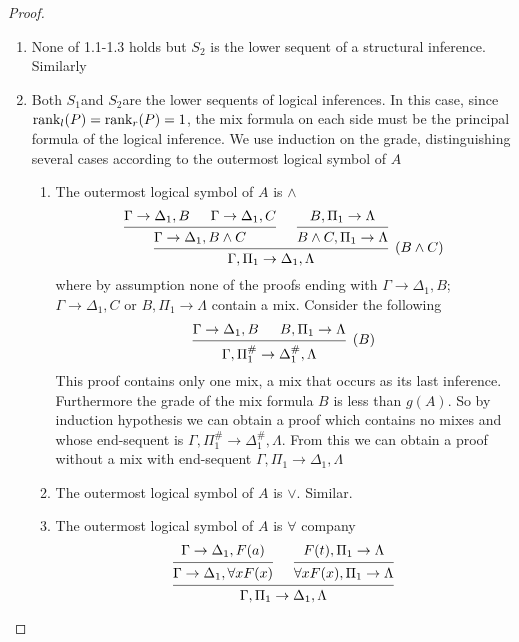 \documentclass[11pt]{article}
\begin{document}
\begin{proof}
\begin{enumerate}
\begin{enumerate}
\item None of 1.1-1.3 holds but \(S_2\) is the lower sequent of a structural
inference. Similarly
\item Both \(S_1\)and \(S_2\)are the lower sequents of logical inferences. In
this case, since \(\text{rank}_l(P)=\text{rank}_r(P)=1\), the mix formula on each
side must be the principal formula of the logical inference. We use
induction on the grade, distinguishing several cases according to the
outermost logical symbol of \(A\)
\begin{enumerate}
\item The outermost logical symbol of \(A\) is \(\wedge\)
\begin{equation*}
\begin{prooftree}%
\hypo{\Gamma\to\Delta_1,B}
\hypo{\Gamma\to\Delta_1,C}
\infer2{\Gamma\to\Delta_1,B\wedge C}
\hypo{B,\Pi_1\to\Lambda}
\infer1{B\wedge C,\Pi_1\to \Lambda}
\infer2[(\(B\wedge C\))]{\Gamma,\Pi_1\to\Delta_1,\Lambda}
\end{prooftree}
\end{equation*}
where by assumption none of the proofs ending with
\(\Gamma\to\Delta_1,B\);\(\Gamma\to\Delta_1,C\) or
\(B,\Pi_1\to\Lambda\) contain a mix. Consider the following
\begin{equation*}
\begin{prooftree}%
\hypo{\Gamma\to\Delta_1,B}
\hypo{B,\Pi_1\to\Lambda}
\infer2[\((B)\)]{\Gamma,\Pi_1^\#\to\Delta_1^\#,\Lambda}
\end{prooftree}
\end{equation*}
This proof contains only one mix, a mix that occurs as its last
inference. Furthermore the grade of the mix formula \(B\) is less 
than \(g(A)\). So by induction hypothesis we can obtain a proof
which contains no mixes and whose end-sequent is
\(\Gamma,\Pi_1^\#\to\Delta_1^\#,\Lambda\). From this we can obtain a proof
without a mix with end-sequent \(\Gamma,\Pi_1\to\Delta_1,\Lambda\)
\item The outermost logical symbol of \(A\) is \(\vee\). Similar.
\item The outermost logical symbol of \(A\) is \(\forall\) company
\begin{equation*}
\begin{prooftree}%
\hypo{\Gamma\to\Delta_1,F(a)}
\infer1{\Gamma\to\Delta_1,\forall xF(x)}
\hypo{F(t),\Pi_1\to\Lambda} 
\infer1{\forall xF(x),\Pi_1\to\Lambda}
\infer2{\Gamma,\Pi_1\to\Delta_1,\Lambda}
\end{prooftree}
\end{equation*}

\end{enumerate}
\end{enumerate}
\end{enumerate}
\end{proof}
\end{document}
